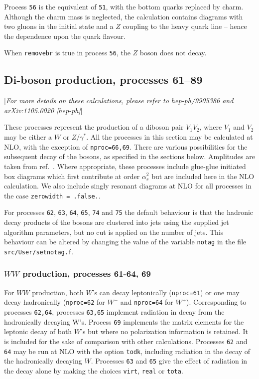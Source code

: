 \documentclass[12pt]{article}
\begin{document}
Process {\tt 56} is the equivalent of {\tt 51}, with the bottom quarks
replaced by charm. Although the charm mass is neglected, the calculation
contains diagrams with two gluons in the initial state and a
$Z$ coupling to the heavy quark line -- hence the dependence upon the quark
flavour.

When {\tt removebr} is true in process {\tt 56}, the $Z$ boson does not decay.

\subsection{Di-boson production, processes 61--89}
\label{subsec:diboson}

\begin{center}
[{\it For more details on these calculations, please refer to hep-ph/9905386
and arXiv:1105.0020 [hep-ph]}]
\end{center}

These processes represent the production of a diboson pair $V_1 V_2$,
where $V_1$ and $V_2$ may be either a $W$ or $Z/\gamma^*$. 
All the processes in this section may be calculated at NLO, with the exception
of {\tt nproc=66,69}. There are various
possibilities for the subsequent decay of the bosons, as specified in the
sections below. Amplitudes are taken from ref.~\cite{Dixon:1998py}.
Where appropriate, these processes include glue-glue initiated box diagrams
which first contribute at order $\alpha_s^2$ but are included here in the
NLO calculation. We also include singly resonant diagrams at NLO for all processes
in the case {\tt zerowidth = .false.}.

For processes {\tt 62}, {\tt 63}, {\tt 64}, {\tt 65}, {\tt 74}
and {\tt 75} the default behaviour is that the hadronic decay products
of the bosons are clustered into jets using the supplied jet
algorithm parameters, but no cut is applied on the number of jets.
This behaviour can be altered by changing the value of the
variable {\tt notag} in the file {\tt src/User/setnotag.f}.
 
\subsubsection{$WW$ production, processes 61-64, 69}

For $WW$ production, both $W$'s can decay leptonically ({\tt nproc=61}) or one
may decay hadronically ({\tt nproc=62} for $W^-$ and {\tt nproc=64} for $W^+$).
Corresponding to processes {\tt 62,64}, processes {\tt 63,65} implement radiation in 
decay from the hadronically decaying W's.
Process {\tt 69} implements the matrix elements for the leptonic decay of
both $W$'s but where no polarization information is retained. It is included
for the sake of comparison with other calculations.
Processes {\tt 62} and {\tt 64} may be run at NLO with the option {\tt todk},
including radiation in the decay of the hadronically decaying $W$.
Processes {\tt 63} and {\tt 65} give the effect of radiation in the decay alone
by making the choices {\tt virt},  {\tt real} or {\tt tota}.
\end{document}
